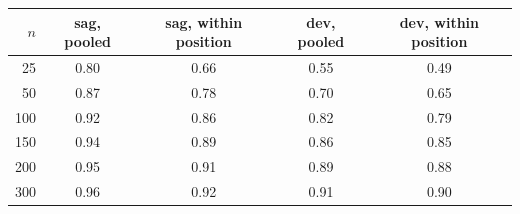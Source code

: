 \begin{tabular}{rcccc}
\hline
$n$ & sag, pooled & sag, within position & dev, pooled & dev, within position \\
\hline
25 & 0.80 & 0.66 & 0.55 & 0.49 \\
50 & 0.87 & 0.78 & 0.70 & 0.65 \\
100 & 0.92 & 0.86 & 0.82 & 0.79 \\
150 & 0.94 & 0.89 & 0.86 & 0.85 \\
200 & 0.95 & 0.91 & 0.89 & 0.88 \\
300 & 0.96 & 0.92 & 0.91 & 0.90 \\
\hline
\end{tabular}
